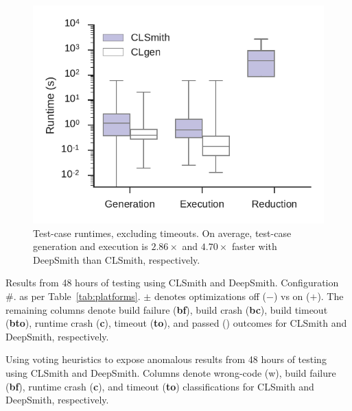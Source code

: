 \begin{figure}
	\centering %
	\includegraphics[width=\columnwidth]{build/img/runtimes}%
	\caption{%
		Test-case runtimes, excluding timeouts. On average, test-case generation and execution is $2.86\times$ and $4.70\times$ faster with DeepSmith than CLSmith, respectively. %
	}%
	\label{fig:runtimes} %
\end{figure}


\begin{table}
	\scriptsize %
	\centering %
	
	\caption{Results from 48 hours of testing using CLSmith and DeepSmith. Configuration \#. as per Table~\ref{tab:platforms}. $\pm$ denotes optimizations off ($-$) vs on ($+$). The remaining columns denote build failure (\textbf{bf}), build crash (\textbf{bc}), build timeout (\textbf{bto}), runtime crash (\textbf{c}), timeout (\textbf{to}), and passed (\textbf{\cmark}) outcomes for CLSmith and DeepSmith, respectively.}
	\label{tab:outcomes}
\end{table}

\begin{table}
	\scriptsize %
	\centering %
	
	\caption{Using voting heuristics to expose anomalous results from 48 hours of testing using CLSmith and DeepSmith. Columns denote wrong-code (w), build failure (\textbf{bf}), runtime crash (\textbf{c}), and timeout (\textbf{to}) classifications for CLSmith and DeepSmith, respectively.}
	\label{tab:classifications}
\end{table}


